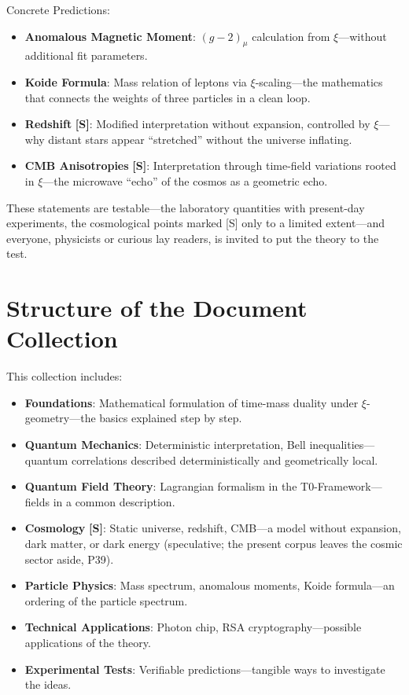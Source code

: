 	\begin{foundation}
		Concrete Predictions:
		\begin{itemize}
			\item \textbf{Anomalous Magnetic Moment}: $(g-2)_\mu$ calculation from $\xi$—without additional fit parameters.
			\item \textbf{Koide Formula}: Mass relation of leptons via $\xi$-scaling—the mathematics that connects the weights of three particles in a clean loop.
			\item \textbf{Redshift} \textbf{[S]}: Modified interpretation without expansion, controlled by $\xi$—why distant stars appear ``stretched'' without the universe inflating.
			\item \textbf{CMB Anisotropies} \textbf{[S]}: Interpretation through time-field variations rooted in $\xi$—the microwave ``echo'' of the cosmos as a geometric echo.
		\end{itemize}
	\end{foundation}
	
	These statements are testable—the laboratory quantities with present-day experiments, the cosmological points marked [S] only to a limited extent—and everyone, physicists or curious lay readers, is invited to put the theory to the test.
	
	\section{Structure of the Document Collection}
	This collection includes:
	\begin{itemize}
		\item \textbf{Foundations}: Mathematical formulation of time-mass duality under $\xi$-geometry—the basics explained step by step.
		\item \textbf{Quantum Mechanics}: Deterministic interpretation, Bell inequalities—quantum correlations described deterministically and geometrically local.
		\item \textbf{Quantum Field Theory}: Lagrangian formalism in the T0-Framework—fields in a common description.
		\item \textbf{Cosmology} \textbf{[S]}: Static universe, redshift, CMB—a model without expansion, dark matter, or dark energy (speculative; the present corpus leaves the cosmic sector aside, P39).
		\item \textbf{Particle Physics}: Mass spectrum, anomalous moments, Koide formula—an ordering of the particle spectrum.
		\item \textbf{Technical Applications}: Photon chip, RSA cryptography—possible applications of the theory.
		\item \textbf{Experimental Tests}: Verifiable predictions—tangible ways to investigate the ideas.
	\end{itemize}
	
